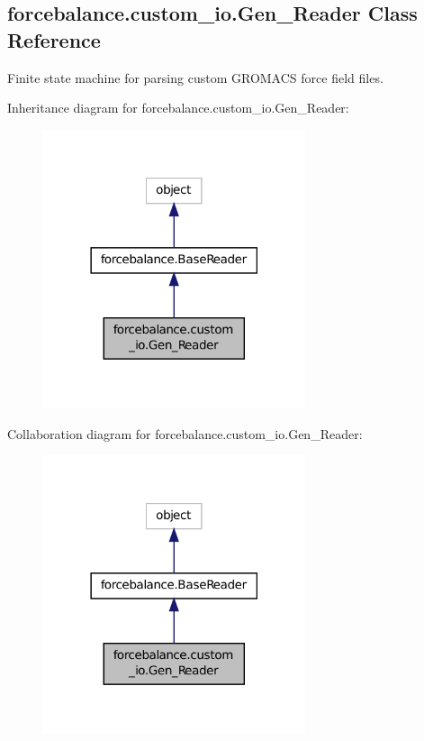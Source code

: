 \hypertarget{classforcebalance_1_1custom__io_1_1Gen__Reader}{\subsection{forcebalance.\-custom\-\_\-io.\-Gen\-\_\-\-Reader Class Reference}
\label{classforcebalance_1_1custom__io_1_1Gen__Reader}
}


Finite state machine for parsing custom G\-R\-O\-M\-A\-C\-S force field files.  




Inheritance diagram for forcebalance.\-custom\-\_\-io.\-Gen\-\_\-\-Reader\-:\nopagebreak
\begin{figure}[H]
\begin{center}
\leavevmode
\includegraphics[width=218pt]{classforcebalance_1_1custom__io_1_1Gen__Reader__inherit__graph}
\end{center}
\end{figure}


Collaboration diagram for forcebalance.\-custom\-\_\-io.\-Gen\-\_\-\-Reader\-:\nopagebreak
\begin{figure}[H]
\begin{center}
\leavevmode
\includegraphics[width=218pt]{classforcebalance_1_1custom__io_1_1Gen__Reader__coll__graph}
\end{center}
\end{figure}

